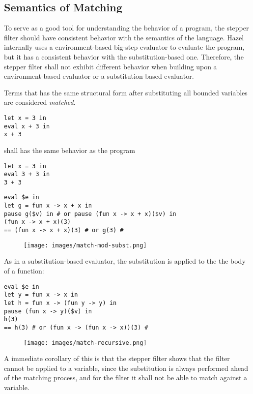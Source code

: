 \subsection{Semantics of Matching}

To serve as a good tool for understanding the behavior of a program, the stepper
filter should have consistent behavior with the semantics of the language. Hazel
internally uses a environment-based big-step evaluator to evaluate the program,
but it has a consistent behavior with the substitution-based one. Therefore,
the stepper filter shall not exhibit different behavior when building upon a
environment-based evaluator or a substitution-based evaluator.

Terms that has the same structural form after substituting all bounded variables
are considered \emph{matched}.

\begin{verbatim}
let x = 3 in
eval x + 3 in
x + 3
\end{verbatim}
shall has the same behavior as the program
\begin{verbatim}
let x = 3 in
eval 3 + 3 in
3 + 3
\end{verbatim}

\begin{verbatim}
eval $e in
let g = fun x -> x + x in
pause g($v) in # or pause (fun x -> x + x)($v) in
(fun x -> x + x)(3)
== (fun x -> x + x)(3) # or g(3) #
\end{verbatim}

\begin{figure}[h]
  \texttt{[image: images/match-mod-subst.png]}
\end{figure}

As in a substitution-based evaluator, the substitution is applied to the
the body of a function:
\begin{verbatim}
eval $e in
let y = fun x -> x in
let h = fun x -> (fun y -> y) in
pause (fun x -> y)($v) in
h(3)
== h(3) # or (fun x -> (fun x -> x))(3) #
\end{verbatim}

\begin{figure}[h]
  \texttt{[image: images/match-recursive.png]}
\end{figure}

A immediate corollary of this is that the stepper filter shows that
the filter cannot be applied to a variable, since the substitution is always
performed ahead of the matching process, and for the filter it shall not be
able to match against a variable.

